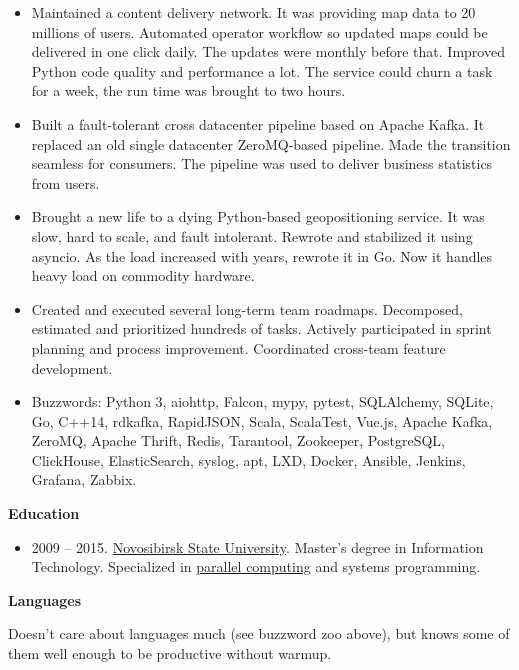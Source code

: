 \documentclass[final]{letter}
\begin{document}
\begin{itemize}
  \begin{itemize}
    \item Maintained a content delivery network. It was providing map data to 20 millions of users.
      Automated operator workflow so updated maps could be delivered in one click daily.
      The updates were monthly before that.
      Improved Python code quality and performance a lot.
       The service could churn a task for a week, the run time was brought to two hours.
    \item Built a fault-tolerant cross datacenter pipeline based on Apache Kafka.
      It replaced an old single datacenter ZeroMQ-based pipeline.
      Made the transition seamless for consumers. The pipeline was used to deliver business statistics from users.
    \item Brought a new life to a dying Python-based geopositioning service.
    It was slow, hard to scale, and fault intolerant.
      Rewrote and stabilized it using asyncio.
      As the load increased with years, rewrote it in Go.
      Now it handles heavy load on commodity hardware.
    \item Created and executed several long-term team roadmaps.
     Decomposed, estimated and prioritized hundreds of tasks.
    Actively participated in sprint planning and process improvement.
    Coordinated cross-team feature development.
    \item Buzzwords: Python 3, aiohttp, Falcon, mypy, pytest, SQLAlchemy, SQLite, Go, C++14, rdkafka, RapidJSON,
     Scala, ScalaTest, Vue.js, Apache Kafka, ZeroMQ, Apache Thrift,
     Redis, Tarantool, Zookeeper, PostgreSQL, ClickHouse, ElasticSearch, syslog, apt, LXD, Docker, Ansible, Jenkins, Grafana, Zabbix.
  \end{itemize}

  \end{itemize}

{\bf Education}
\begin{itemize}
  \item 2009 -- 2015. \href{https://www.nsu.ru/n/}{Novosibirsk State University}.
  Master's degree in Information Technology.
  Specialized in \href{http://ssd.sscc.ru/en/info}{parallel computing} and systems programming.
\end{itemize}

\newpage

{\bf Languages}

Doesn't care about languages much (see buzzword zoo above), but knows some of them well enough to be productive without warmup.
\end{document}
